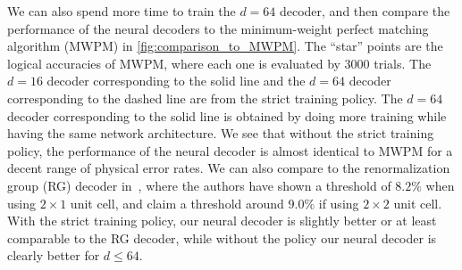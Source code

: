 We can also spend more time to train the $d=64$ decoder, and then compare the performance of the neural decoders to the minimum-weight perfect matching algorithm (MWPM) in \autoref{fig:comparison_to_MWPM}.
The ``star'' points are the logical accuracies of MWPM, where each one is evaluated by $3000$ trials.
The $d=16$ decoder corresponding to the solid line and the $d=64$ decoder corresponding to the dashed line are from the strict training policy.
The $d=64$ decoder corresponding to the solid line is obtained by doing more training while having the same network architecture.
We see that without the strict training policy, the performance of the neural decoder is almost identical to MWPM for a decent range of physical error rates.
We can also compare to the renormalization group (RG) decoder in~\cite{duclos2010fast}, where the authors have shown a threshold of $8.2\%$ when using $2\times 1$ unit cell, and claim a threshold around $9.0\%$ if using $2\times 2$ unit cell.
With the strict training policy, our neural decoder is slightly better or at least comparable to the RG decoder, while without the policy our neural decoder is clearly better for $d\leq 64$.
\smallskip